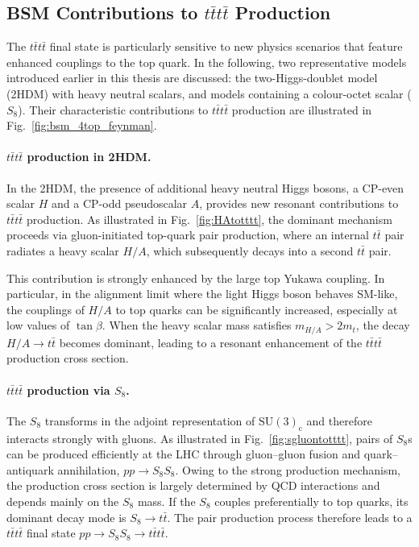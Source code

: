 \subsection{BSM Contributions to $t\bar{t}t\bar{t}$ Production}

The $t\bar{t}t\bar{t}$ final state is particularly sensitive to new physics scenarios that feature enhanced couplings to the top quark. 
In the following, two representative models introduced earlier in this thesis are discussed: the two-Higgs-doublet model (2HDM) with heavy neutral scalars, and models containing a colour-octet scalar ($S_{8}$).
Their characteristic contributions to $t\bar{t}t\bar{t}$ production are illustrated in Fig.~\ref{fig:bsm_4top_feynman}.

\paragraph{$t\bar{t}t\bar{t}$ production in 2HDM.}
In the 2HDM, the presence of additional heavy neutral Higgs bosons, a CP-even scalar \(H\) and a CP-odd pseudoscalar \(A\), provides new resonant contributions to $t\bar{t}t\bar{t}$ production. 
As illustrated in Fig.~\ref{fig:HAtotttt}, the dominant mechanism proceeds via gluon-initiated top-quark pair production,
where an internal \(t\bar{t}\) pair radiates a heavy scalar \(H/A\), which subsequently decays into a second \(t\bar{t}\) pair.

This contribution is strongly enhanced by the large top Yukawa coupling. In particular, in the alignment limit where the light Higgs boson behaves SM-like, 
the couplings of \(H/A\) to top quarks can be significantly increased, especially at low values of \(\tan\beta\).
When the heavy scalar mass satisfies \(m_{H/A} > 2m_t\), the decay \(H/A \to t\bar{t}\) becomes dominant, leading to a resonant enhancement of the $t\bar{t}t\bar{t}$ production cross section.

\paragraph{$t\bar{t}t\bar{t}$ production via $S_{8}$.}
\label{sec:sgluon_tttt}

The $S_{8}$ transforms in the adjoint representation
of \(\mathrm{SU}(3)_\mathrm{c}\) and therefore interacts strongly with gluons.
As illustrated in Fig.~\ref{fig:sgluontotttt}, pairs of $S_{8}$s can be produced efficiently at the LHC through
gluon--gluon fusion and quark--antiquark annihilation,
\(pp \rightarrow S_8 S_8\).
Owing to the strong production mechanism, the production cross section
is largely determined by QCD interactions and depends mainly on the
$S_{8}$ mass.
If the $S_{8}$ couples preferentially to top quarks,
its dominant decay mode is \(S_8 \rightarrow t\bar{t}\).
The pair production process therefore leads to a $t\bar{t}t\bar{t}$ final state
\(pp \rightarrow S_8 S_8 \rightarrow t\bar{t}t\bar{t}\).

